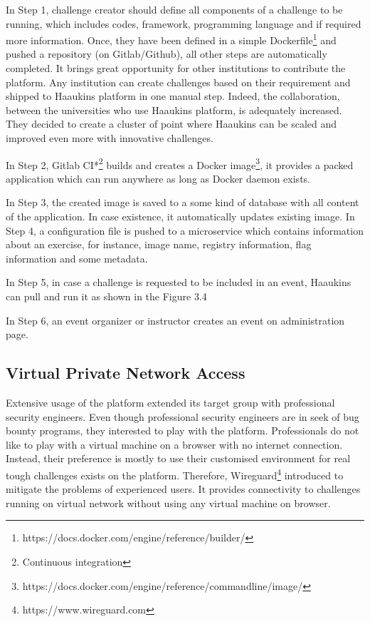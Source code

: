 In Step 1, challenge creator should define all components of a challenge to be running, which includes codes, framework, programming language and if required more information. Once, they have been defined in a simple Dockerfile\footnote{https://docs.docker.com/engine/reference/builder/} and pushed a repository (on Gitlab/Github), all other steps are automatically completed.  It brings great opportunity for other institutions to contribute the platform. Any institution can create challenges based on their requirement and shipped to Haaukins platform in one manual step. Indeed, the collaboration, between the universities who use Haaukins platform, is adequately increased. They decided to create a cluster of point where Haaukins can be scaled and improved even more with innovative challenges. 

In Step 2, Gitlab CI*\footnote{Continuous integration} builds and creates a Docker image\footnote{https://docs.docker.com/engine/reference/commandline/image/}, it provides a packed application which can run anywhere as long as Docker daemon exists. 

In Step 3, the created image is saved to a some kind of database with all content of the application. In case existence, it automatically updates existing image. 
In Step 4, a configuration file is pushed to a microservice which contains information about an exercise, for instance, image name, registry information, flag information and some metadata. 

In Step 5, in case a challenge is requested to be included in an event, Haaukins can pull and run it as shown in the Figure 3.4

In Step 6, an event organizer or instructor creates an event on administration page. 

\subsection{Virtual Private Network Access}
Extensive usage of the platform extended its target group with professional security engineers. Even though professional security engineers are in seek of bug bounty programs, they interested to play with the platform. Professionals do not like to play with a virtual machine on a browser with no internet connection. Instead, their preference is mostly to use their customised environment for real tough challenges exists on the platform. Therefore, Wireguard\footnote{https://www.wireguard.com} introduced to mitigate the problems of experienced users. It provides connectivity to challenges running on virtual network without using any virtual machine on browser. 


